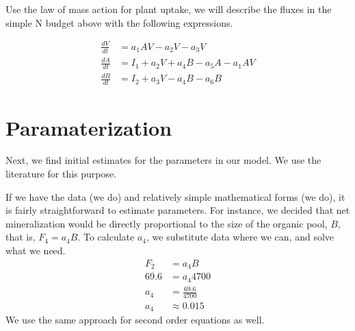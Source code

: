 \documentclass[
]{book}
\begin{document}
Use the law of mass action for plant uptake, we will describe the fluxes in the simple N budget above with the following expressions.

\begin{align}
\frac{dV}{dt} &= a_{1}AV - a_{2}V - a_3 V\\
\frac{dA}{dt} &= I_1 + a_{2}V +  a_{4}B - a_{5}A - a_{1}AV\\
\frac{dB}{dt} &= I_2 + a_{3}V - a_{4}B - a_{6}B
\end{align}

\hypertarget{paramaterization}{%
\section{Paramaterization}\label{paramaterization}}

Next, we find initial estimates for the parameters in our model. We use the
literature for this purpose.

If we have the data (we do) and relatively simple mathematical forms
(we do), it is fairly straightforward to estimate parameters. For
instance, we decided that net mineralization would be directly
proportional to the size of the organic pool, \(B\), that is, \(F_4 = a_4B\). To calculate \(a_4\), we substitute data where we can, and solve
what we need.
\begin{align*}
  F_2 &= a_4 B\\
  69.6 &= a_4 4700 \\
  a_4 &= \frac{69.6}{4700}\\
  a_4 &\approx 0.015
\end{align*}
We use the same approach for second order equations as well.
\end{document}
